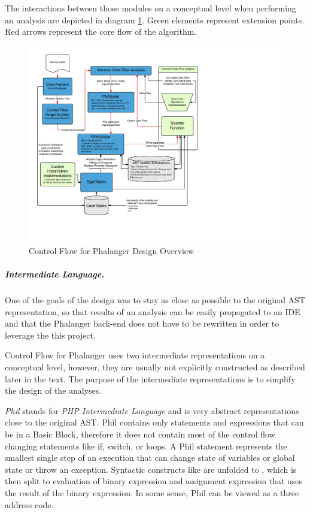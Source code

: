     The interactions between those modules on a conceptual level 
    when performing an analysis are depicted in diagram \ref{overalldiagram}. 
    Green elements represent extension points. Red arrows represent the 
    core flow of the algorithm.

\begin{figure}[h]  
  \centering
    \includegraphics*[width=\textwidth,height=\textheight,keepaspectratio,viewport=0 55 532 590]{img/ControlFlowModules.pdf}  
    \caption{Control Flow for Phalanger Design Overview\label{overalldiagram}}
\end{figure}    

    \subparagraph*{Intermediate Language.}
    One of the goals of the design was to stay as close as possible 
    to the original AST representation, so that results of an 
    analysis can be easily propagated to an IDE and that the 
    Phalanger back-end does not have to be rewritten in order to 
    leverage the this project.
    
    Control Flow for Phalanger uses two intermediate representations 
    on a conceptual level, however, they are usually not explicitly 
    constructed as described later in the text. The purpose of the 
    intermediate representations is to simplify the design of the 
    analyses.
    
    \emph{Phil} stands for \emph{PHP Intermediate Language} and is very abstract 
    representations close to the original AST. Phil contains 
    only statements and expressions that can be in a Basic Block, 
    therefore it does not contain most of the control flow 
    changing statements like if, switch, or loops. 
    A Phil statement represents the smallest single step 
    of an execution that can change state of variables 
    or global state or throw an exception. Syntactic 
    constructs like  are unfolded to 
    , which is then split to 
    evaluation of binary expression and assignment expression 
    that uses the result of the binary expression. In some sense, 
    Phil can be viewed as a three address code.
    

